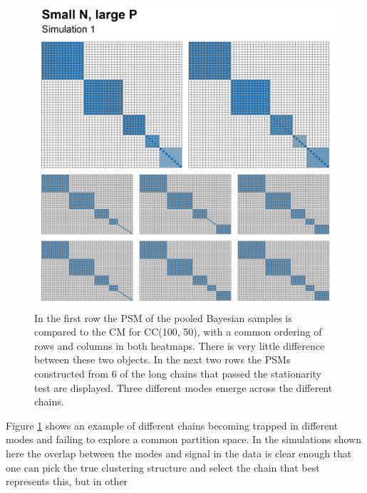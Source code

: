 \documentclass{bioinfo}
\begin{document}
\begin{figure} %
	\centering
	\includegraphics[scale=0.5]{./Images/Simulations/small_n_large_p_base/comp_psms_cm.png}	
	\caption{In the first row the PSM of the pooled Bayesian samples is compared to the CM for CC(100, 50), with a common ordering of rows and columns in both heatmaps. There is very little difference between these two objects. In the next two rows the PSMs constructed from 6 of the long chains that passed the stationarity test are displayed. Three different modes emerge across the different chains.}
	\label{fig:simSmallNLargePPSMs}
\end{figure}

Figure \ref{fig:simSmallNLargePPSMs} shows an example of different chains becoming trapped in different modes and failing to explore a common partition space. In the simulations shown here the overlap between the modes and signal in the data is clear enough that one can pick the true clustering structure and select the chain that best represents this, but in other
\end{document}
